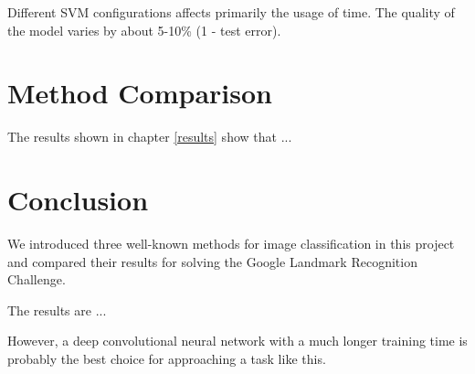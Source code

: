 Different SVM configurations affects primarily the usage of time. The quality of the model varies by about 5-10\% (1 - test error).


\chapter{Method Comparison}

The results shown in chapter \ref{results} show that ...

\chapter{Conclusion}

We introduced three well-known methods for image classification in this project and compared their results for solving the Google Landmark Recognition Challenge.

The results are ...

However, a deep convolutional neural network with a much longer training time is probably the best choice for approaching a task like this.